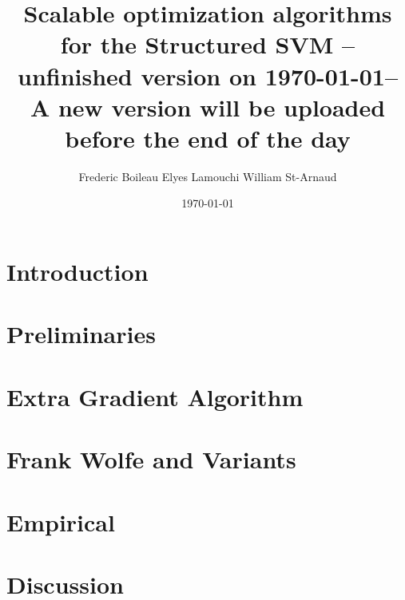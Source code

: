 

\usepackage[
  backend=biber,
  citestyle=authoryear-ibid,
  natbib=true
  ]{biblatex}
\usepackage{csquotes}
\usepackage{comment}
\usepackage{fancyhdr}
\pagestyle{fancyplain}
\fancyhf{}
\rhead{ \fancyplain{}{\today} }
\rfoot{ \fancyplain{}{\thepage} }

\renewcommand\nameyeardelim{, }



\usepackage[toc,page]{appendix}

\title{Scalable optimization algorithms for the Structured SVM -- unfinished
  version on \today  -- A new version will be uploaded before the end of the day}
\date{\today}
\author{Frederic Boileau Elyes Lamouchi William St-Arnaud}

\maketitle

\tableofcontents
\clearpage
\section{Introduction}


\clearpage
\section{Preliminaries}

% 

\clearpage
\section{Extra Gradient Algorithm}


\clearpage
\section{Frank Wolfe and Variants}


\clearpage
\section{Empirical}

% 


\clearpage
\section{Discussion}


